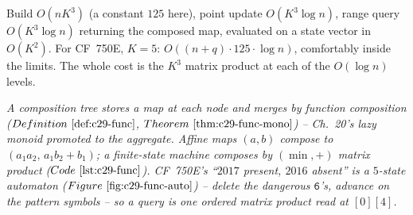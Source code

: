 \begin{complexitybox}
Build \(O(n K^3)\) (a constant \(125\) here), point update \(O(K^3\log n)\), range
query \(O(K^3\log n)\) returning the composed map, evaluated on a state vector in
\(O(K^2)\).  For CF~750E, \(K=5\): \(O((n+q)\cdot125\cdot\log n)\), comfortably
inside the limits.  The whole cost is the \(K^3\) matrix product at each of the
\(O(\log n)\) levels.
\end{complexitybox}

\begin{recallbox}
\emph{A composition tree stores a \emph{map} at each node and merges by
function composition (\(\defref{c29-func}\), \(\thmref{c29-func-mono}\)) --
Ch.~20's lazy monoid promoted to the aggregate.  Affine maps \((a,b)\) compose to
\((a_1a_2,\,a_1b_2+b_1)\); a finite-state machine composes by \((\min,+)\) matrix
product (\(\coderef{c29-func}\)).  CF~750E's ``\(2017\) present, \(2016\) absent''
is a \(5\)-state automaton (\(\figref{c29-func-auto}\)) -- delete the dangerous
\(\texttt{6}\)'s, advance on the pattern symbols -- so a query is one ordered
matrix product read at \([0][4]\).}
\end{recallbox}
